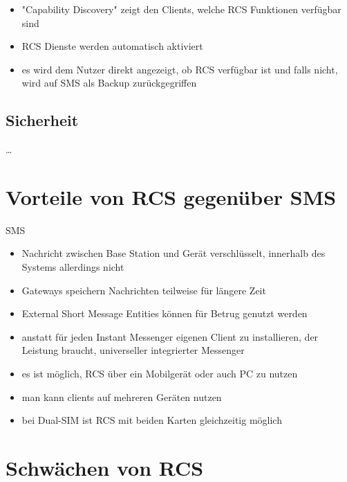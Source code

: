\documentclass[conference]{IEEEtran}
\begin{document}
\begin{itemize}
    \item "Capability Discovery" zeigt den Clients, welche RCS Funktionen verfügbar sind
    \item RCS Dienste werden automatisch aktiviert
    \item es wird dem Nutzer direkt angezeigt, ob RCS verfügbar ist und falls nicht, wird auf SMS als Backup zurückgegriffen
\end{itemize}
\cite{uniprof}

\subsection{Sicherheit}

\dots

\section{Vorteile von RCS gegenüber SMS}

SMS

\begin{itemize}
    \item Nachricht zwischen Base Station und Gerät verschlüsselt, innerhalb des Systems allerdings nicht
    \item Gateways speichern Nachrichten teilweise für längere Zeit
    \item External Short Message Entities können für Betrug genutzt werden
\end{itemize}
\cite{sendoutsms}

\begin{itemize}
    \item anstatt für jeden Instant Messenger eigenen Client zu installieren, der Leistung braucht, universeller integrierter Messenger
    \item es ist möglich, RCS über ein Mobilgerät oder auch PC zu nutzen
\end{itemize}
\cite{rcsmno}

\begin{itemize}
    \item man kann clients auf mehreren Geräten nutzen
    \item bei Dual-SIM ist RCS mit beiden Karten gleichzeitig möglich
\end{itemize}
\cite{uniprof}

\section{Schwächen von RCS}
\end{document}
